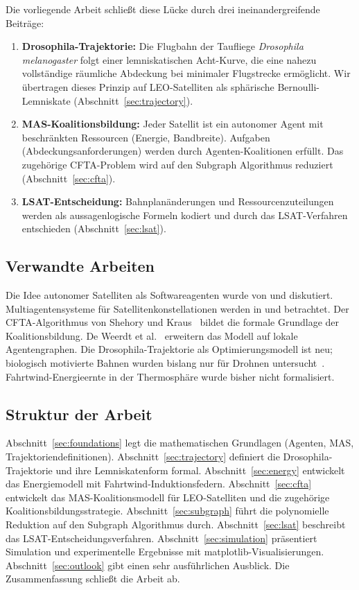 ﻿\documentclass[a4paper,12pt]{article}
\theoremstyle{definition}
\begin{document}
Die vorliegende Arbeit schlie\ss t diese L\"ucke durch drei ineinandergreifende Beitr\"age:
\begin{enumerate}[label=(\roman*)]
  \item \textbf{Drosophila-Trajektorie:} Die Flugbahn der Taufliege \emph{Drosophila melanogaster}
    folgt einer lemniskatischen Acht-Kurve, die eine nahezu vollst\"andige r\"aumliche Abdeckung
    bei minimaler Flugstrecke erm\"oglicht. Wir \"ubertragen dieses Prinzip auf LEO-Satelliten
    als sph\"arische Bernoulli-Lemniskate (Abschnitt~\ref{sec:trajectory}).
  \item \textbf{MAS-Koalitionsbildung:} Jeder Satellit ist ein autonomer Agent mit beschr\"ankten
    Ressourcen (Energie, Bandbreite). Aufgaben (Abdeckungsanforderungen) werden durch
    Agenten-Koalitionen erf\"ullt. Das zugeh\"orige CFTA-Problem wird auf den Subgraph Algorithmus \cite{Epp2026} reduziert (Abschnitt~\ref{sec:cfta}).
  \item \textbf{LSAT-Entscheidung:} Bahnplan\"anderungen und Ressourcenzuteilungen werden
    als aussagenlogische Formeln kodiert und durch das LSAT-Verfahren \cite{Epp2026lsat}
    entschieden (Abschnitt~\ref{sec:lsat}).
\end{enumerate}

\subsection{Verwandte Arbeiten}

Die Idee autonomer Satelliten als Softwareagenten wurde von \cite{Wertz99} und \cite{Wertz12}
diskutiert. Multiagentensysteme f\"ur Satellitenkonstellationen werden in \cite{Rao95} und
\cite{Sycara98} betrachtet. Der CFTA-Algorithmus von Shehory und Kraus~\cite{SK98} bildet
die formale Grundlage der Koalitionsbildung. De Weerdt et al.~\cite{dZK07} erweitern das
Modell auf lokale Agentengraphen. Die Drosophila-Trajektorie als Optimierungsmodell
ist neu; biologisch motivierte Bahnen wurden bislang nur f\"ur Drohnen untersucht~\cite{Floreano15}.
Fahrtwind-Energieernte in der Thermosph\"are wurde bisher nicht formalisiert.

\subsection{Struktur der Arbeit}

Abschnitt~\ref{sec:foundations} legt die mathematischen Grundlagen (Agenten, MAS, Trajektoriendefinitionen). Abschnitt~\ref{sec:trajectory} definiert die Drosophila-Trajektorie und ihre Lemniskatenform formal. Abschnitt~\ref{sec:energy} entwickelt das Energiemodell mit Fahrtwind-Induktionsfedern. Abschnitt~\ref{sec:cfta} entwickelt das MAS-Koalitionsmodell für LEO-Satelliten und die zugehörige Koalitionsbildungsstrategie. Abschnitt~\ref{sec:subgraph} führt die polynomielle Reduktion auf den Subgraph Algorithmus durch. Abschnitt~\ref{sec:lsat} beschreibt das LSAT-Entscheidungsverfahren. Abschnitt~\ref{sec:simulation} präsentiert Simulation und experimentelle Ergebnisse mit matplotlib-Visualisierungen. Abschnitt~\ref{sec:outlook} gibt einen sehr ausführlichen Ausblick. Die Zusammenfassung schließt die Arbeit ab.
\end{document}
